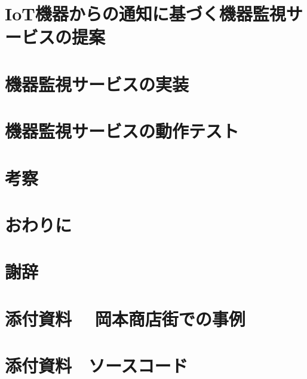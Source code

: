 \documentclass[a4paper]{jreport}
\begin{document}
\chapter{IoT機器からの通知に基づく機器監視サービスの提案}

\chapter{機器監視サービスの実装}

\chapter{機器監視サービスの動作テスト}


\chapter{考察}


\chapter{おわりに}


\chapter*{謝辞}




\chapter*{添付資料　 岡本商店街での事例}


\chapter*{添付資料　ソースコード}


\begin{comment}
\chapter*{添付資料　エージェントプログラム用インターフェース　ソースコード
\addcontentsline{toc}{chapter}{添付資料3　エージェントプログラム用インターフェース　ソースコード}

\chapter*{添付資料　Webアプリケーション　ソースコード}
\addcontentsline{toc}{chapter}{添付資料4　Webアプリケーション　ソースコード}
\end{comment}
\end{document}
